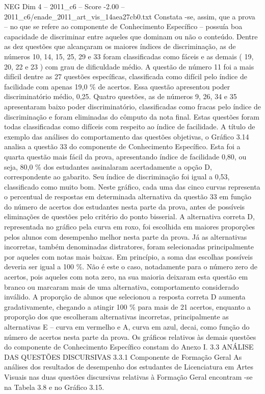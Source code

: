 \begin{textsample}{NEG Dim 4 – 2011\_c6 – Score -2.00 – 2011\_c6/enade\_2011\_art\_vis\_14aea27cb0.txt}
Constata -se, assim, que a prova – no que se refere ao componente de Conhecimento Específico – possuía boa capacidade de discriminar entre aqueles que dominam ou não o conteúdo.
Dentre as dez questões que alcançaram os maiores índices de discriminação, as de números 10, 14, 15, 25, 29 e 33 foram classificadas como fáceis e as demais ( 19, 20, 22 e 23 ) com grau de dificuldade médio.
A questão de número 11 foi a mais difícil dentre as 27 questões específicas, classificada como difícil pelo índice de facilidade com apenas 19,0 \% de acertos.
Essa questão apresentou poder discriminatório médio, 0,25.
Quatro questões, as de números 9, 26, 34 e 35 apresentaram baixo poder discriminatório, classificadas como fracas pelo índice de discriminação e foram eliminadas do cômputo da nota final.
Estas questões foram todas classificadas como difíceis com respeito ao índice de facilidade.
A título de exemplo das análises do comportamento das questões objetivas, o Gráfico 3.14 analisa a questão 33 do componente de Conhecimento Específico.
Esta foi a quarta questão mais fácil da prova, apresentando índice de facilidade 0,80, ou seja, 80,0 \% dos estudantes assinalaram acertadamente a opção D, correspondente ao gabarito.
Seu índice de discriminação foi igual a 0,53, classificado como muito bom.
Neste gráfico, cada uma das cinco curvas representa o percentual de respostas em determinada alternativa da questão 33 em função do número de acertos dos estudantes nesta parte da prova, antes de possíveis eliminações de questões pelo critério do ponto bisserial.
A alternativa correta D, representada no gráfico pela curva em roxo, foi escolhida em maiores proporções pelos alunos com desempenho melhor nesta parte da prova.
Já as alternativas incorretas, também denominadas distratores, foram selecionadas principalmente por aqueles com notas mais baixas.
Em princípio, a soma das escolhas possíveis deveria ser igual a 100 \%.
Não é este o caso, notadamente para o número zero de acertos, pois aqueles com nota zero, na sua maioria deixaram esta questão em branco ou marcaram mais de uma alternativa, comportamento considerado inválido.
A proporção de alunos que selecionou a resposta correta D aumenta gradativamente, chegando a atingir 100 \% para mais de 21 acertos, enquanto a proporção dos que escolheram alternativas incorretas, principalmente as alternativas E – curva em vermelho e A, curva em azul, decai, como função do número de acertos nesta parte da prova.
Os gráficos relativos às demais questões do componente de Conhecimento Específico constam do Anexo I. 3.3 ANÁLISE DAS QUESTÕES DISCURSIVAS 3.3.1 Componente de Formação Geral As análises dos resultados de desempenho dos estudantes de Licenciatura em Artes Visuais nas duas questões discursivas relativas à Formação Geral encontram -se na Tabela 3.8 e no Gráfico 3.15.

\end{textsample}
